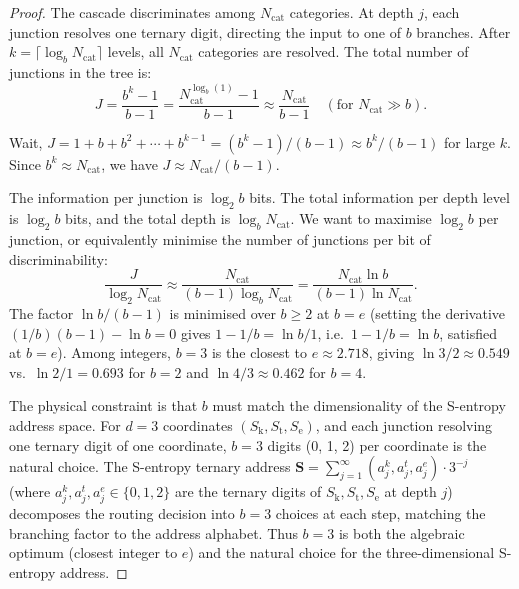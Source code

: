 \documentclass[11pt,twocolumn,a4paper]{article}
\theoremstyle{remark}
\newcommand{\Sk}{S_{\mathrm{k}}}
\newcommand{\St}{S_{\mathrm{t}}}
\newcommand{\Se}{S_{\mathrm{e}}}
\newcommand{\Sent}{\bm{S}}
\begin{document}
\begin{proof}
The cascade discriminates among $N_{\mathrm{cat}}$ categories. At depth $j$,
each junction resolves one ternary digit, directing the input to one of $b$ branches.
After $k = \lceil \log_b N_{\mathrm{cat}} \rceil$ levels, all $N_{\mathrm{cat}}$
categories are resolved. The total number of junctions in the tree is:
\begin{equation}
J = \frac{b^k - 1}{b - 1} = \frac{N_{\mathrm{cat}}^{\log_b(1)} - 1}{b - 1}
\approx \frac{N_{\mathrm{cat}}}{b - 1}
\quad (\text{for } N_{\mathrm{cat}} \gg b).
\label{eq:junctions}
\end{equation}

Wait, $J = 1 + b + b^2 + \cdots + b^{k-1} = (b^k - 1)/(b-1) \approx b^k/(b-1)$
for large $k$.
Since $b^k \approx N_{\mathrm{cat}}$, we have $J \approx N_{\mathrm{cat}} / (b-1)$.

The information per junction is $\log_2 b$ bits. The total information per depth
level is $\log_2 b$ bits, and the total depth is $\log_b N_{\mathrm{cat}}$.
We want to maximise $\log_2 b$ per junction, or equivalently minimise the
number of junctions per bit of discriminability:
\begin{equation}
\frac{J}{\log_2 N_{\mathrm{cat}}} \approx \frac{N_{\mathrm{cat}}}{(b-1)\log_b N_{\mathrm{cat}}}
= \frac{N_{\mathrm{cat}} \ln b}{(b-1)\ln N_{\mathrm{cat}}}.
\label{eq:jperbit}
\end{equation}
The factor $\ln b / (b-1)$ is minimised over $b \geq 2$ at $b = e$
(setting the derivative $(1/b)(b-1) - \ln b = 0$ gives $1 - 1/b = \ln b / 1$,
i.e.\ $1 - 1/b = \ln b$, satisfied at $b = e$). Among integers, $b = 3$
is the closest to $e \approx 2.718$, giving $\ln 3 / 2 \approx 0.549$
vs.\ $\ln 2 / 1 = 0.693$ for $b = 2$ and $\ln 4 / 3 \approx 0.462$ for $b = 4$.

The physical constraint is that $b$ must match the dimensionality of the S-entropy
address space. For $d = 3$ coordinates $(\Sk, \St, \Se)$, and each junction
resolving one ternary digit of one coordinate, $b = 3$ digits (0, 1, 2) per
coordinate is the natural choice. The S-entropy ternary address
$\Sent = \sum_{j=1}^\infty (a_j^k, a_j^t, a_j^e) \cdot 3^{-j}$
(where $a_j^k, a_j^t, a_j^e \in \{0,1,2\}$ are the ternary digits of $\Sk,
\St, \Se$ at depth $j$) decomposes the routing decision into $b = 3$ choices
at each step, matching the branching factor to the address alphabet. Thus $b = 3$
is both the algebraic optimum (closest integer to $e$) and the natural choice
for the three-dimensional S-entropy address.
\end{proof}
\end{document}
